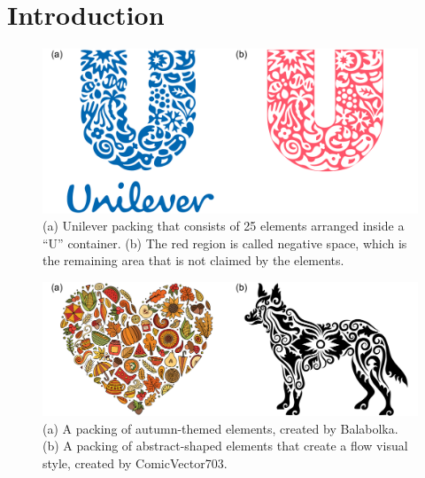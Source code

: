 
\chapter{Introduction}
\label{chapter_introduction}

\begin{figure}
\centering
\includegraphics[width=1.0\textwidth]{figures/intro/unilever_w_neg_space.pdf} 
\caption[Unilever packing and its negative space]
{\label{fig_logo_packing} 
\newtext
{
(a) Unilever packing that consists of 25 elements arranged inside a ``U'' container. \newline
(b) The red region is called negative space, which is the remaining area that is not claimed by the elements. 
}
}
\end{figure}

\begin{figure}
\centering
\includegraphics[width=1.0\textwidth]{figures/intro/balabolka_dog_flow.pdf} 
\caption[Packings in graphic design]
{\label{fig_graphic_designs} 
\newtext
{
(a) A packing of autumn-themed elements, created by Balabolka.
(b) A packing of abstract-shaped elements that create a flow visual style, created by ComicVector703.
}
 }
\end{figure}

